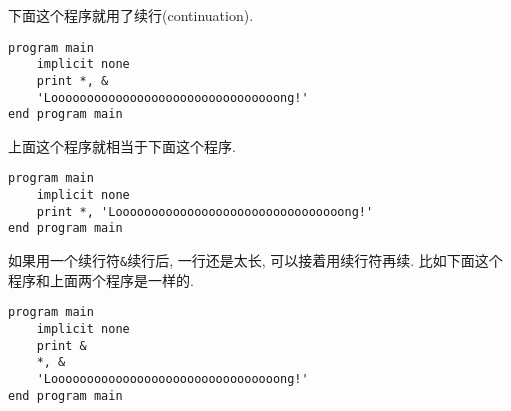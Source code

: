 下面这个程序就用了续行(continuation).
\begin{lstlisting}
program main
    implicit none
    print *, &
    'Loooooooooooooooooooooooooooooooong!'
end program main
\end{lstlisting}
上面这个程序就相当于下面这个程序.
\begin{lstlisting}
program main
    implicit none
    print *, 'Loooooooooooooooooooooooooooooooong!'
end program main
\end{lstlisting}

如果用一个续行符\texttt{\&{}}续行后, 一行还是太长, 可以接着用续行符再续. 比如下面这个程序和上面两个程序是一样的.
\begin{lstlisting}
program main
    implicit none
    print &
    *, &
    'Loooooooooooooooooooooooooooooooong!'
end program main
\end{lstlisting}

